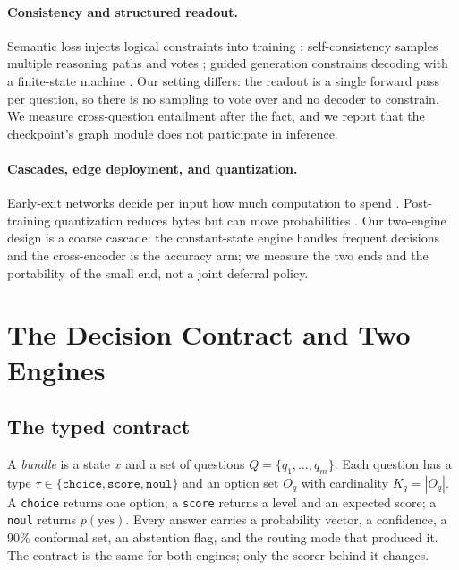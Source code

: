 \paragraph{Consistency and structured readout.}
Semantic loss injects logical constraints into training \cite{xu2018semantic}; self-consistency samples multiple reasoning paths and votes \cite{wang2023selfconsistency}; guided generation constrains decoding with a finite-state machine \cite{willard2023guided}. Our setting differs: the readout is a single forward pass per question, so there is no sampling to vote over and no decoder to constrain. We measure cross-question entailment after the fact, and we report that the checkpoint's graph module does not participate in inference.

\paragraph{Cascades, edge deployment, and quantization.}
Early-exit networks decide per input how much computation to spend \cite{teerapittayanon2016branchynet,xin2020fastbert,zhou2020deebert}. Post-training quantization reduces bytes but can move probabilities \cite{dettmers2022llmint8,frantar2023gptq,xiao2023smoothquant}. Our two-engine design is a coarse cascade: the constant-state engine handles frequent decisions and the cross-encoder is the accuracy arm; we measure the two ends and the portability of the small end, not a joint deferral policy.

\section{The Decision Contract and Two Engines}
\label{sec:contract}

\subsection{The typed contract}
A \emph{bundle} is a state $x$ and a set of questions $Q=\{q_1,\dots,q_m\}$. Each question has a type $\tau\in\{\texttt{choice},\texttt{score},\texttt{noul}\}$ and an option set $O_q$ with cardinality $K_q=|O_q|$. A \texttt{choice} returns one option; a \texttt{score} returns a level and an expected score; a \texttt{noul} returns $p(\text{yes})$. Every answer carries a probability vector, a confidence, a 90\% conformal set, an abstention flag, and the routing mode that produced it. The contract is the same for both engines; only the scorer behind it changes.

